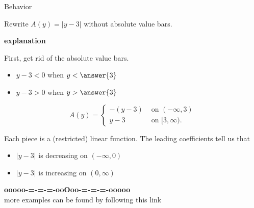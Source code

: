 \documentclass{ximera}
\begin{document}
\begin{example}  Behavior


Rewrite $A(y) = | y - 3|$ without absolute value bars.



\textbf{\textcolor{red!75!green}{explanation}} 


First, get rid of the absolute value bars.

\begin{itemize}
\item $y - 3 < 0$ when $y < \answer{3}$
\item $y - 3 > 0$ when $y > \answer{3}$
\end{itemize}



\[
A(y) = 
\begin{cases}
  -(y - 3) & \text{ on } (-\infty, 3)   \\
  y - 3  & \text{ on } [3, \infty).
\end{cases}
\]





Each piece is a (restricted) linear function.  The leading coefficients tell us that


\begin{itemize}
\item $|y-3|$ is decreasing on $(-\infty, 0)$
\item $|y-3|$ is increasing on $(0, \infty)$
\end{itemize}



\end{example}


















\begin{center}
\textbf{\textcolor{green!50!black}{ooooo-=-=-=-ooOoo-=-=-=-ooooo}} \\

more examples can be found by following this link\\ 

\end{center}
\end{document}
